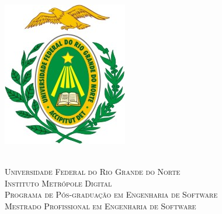

\begin{titlingpage}
	\begin{center}
		\begin{minipage}{2.2cm}
			\begin{center}
				\includegraphics[scale=1.2]{Imagens/Brasao-UFRN.jpg}
			\end{center}
		\end{minipage}
		\begin{minipage}{10.15cm}
			\begin{center}
					{\small \ \\
                       \textsc{Universidade Federal do Rio Grande do Norte}		   			\\
							  \textsc{Instituto Metrópole Digital}					\\
							  \textsc{Programa de Pós-graduação em Engenharia de Software}	\\
                       \textsc{Mestrado Profissional em Engenharia de Software}}   				\\
			\end{center}
		\end{minipage}
		\begin{minipage}{2.2cm}
			\begin{center}

\end{center}
\end{minipage}
\end{center}
\end{titlingpage}
